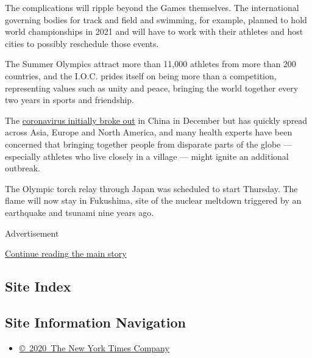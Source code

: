 The complications will ripple beyond the Games themselves. The
international governing bodies for track and field and swimming, for
example, planned to hold world championships in 2021 and will have to
work with their athletes and host cities to possibly reschedule those
events.

The Summer Olympics attract more than 11,000 athletes from more than 200
countries, and the I.O.C. prides itself on being more than a
competition, representing values such as unity and peace, bringing the
world together every two years in sports and friendship.

The
\href{https://www.nytimes3xbfgragh.onion/interactive/2020/03/22/world/coronavirus-spread.html}{coronavirus
initially broke out} in China in December but has quickly spread across
Asia, Europe and North America, and many health experts have been
concerned that bringing together people from disparate parts of the
globe --- especially athletes who live closely in a village --- might
ignite an additional outbreak.

The Olympic torch relay through Japan was scheduled to start Thursday.
The flame will now stay in Fukushima, site of the nuclear meltdown
triggered by an earthquake and tsunami nine years ago.

Advertisement

\protect\hyperlink{after-bottom}{Continue reading the main story}

\hypertarget{site-index}{%
\subsection{Site Index}\label{site-index}}

\hypertarget{site-information-navigation}{%
\subsection{Site Information
Navigation}\label{site-information-navigation}}

\begin{itemize}
\tightlist
\item
  \href{https://help.nytimes3xbfgragh.onion/hc/en-us/articles/115014792127-Copyright-notice}{©~2020~The
  New York Times Company}
\end{itemize}

